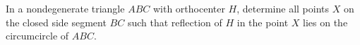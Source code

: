 In a nondegenerate triangle $ABC$ with orthocenter $H$, determine all points $X$ on the closed side segment $BC$ such that reflection of $H$ in the point $X$ lies on the circumcircle of $ABC$.
